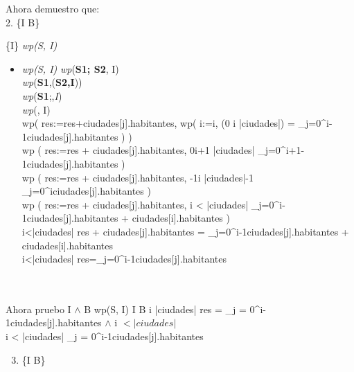 \documentclass[10pt,a4paper]{article}
\begin{document}
\vspace{0.3cm}

Ahora demuestro que:\\
\vspace{0.3cm}
2.  {\{I \land B\}}  {\{{I}\}  \implica \textit{wp(S, I)}
	
	\begin{itemize}
		\item 
		\textit{wp(S, I)}
		\equiv \textit{wp}(\textbf{S1; S2}, I)  \\
		\equiv \textit{wp}(\textbf{S1},(\textbf{S2,I}))  \\
		\equiv \textit{wp}(\textbf{S1};\;\;,\textit{I}) \\
		\equiv \textit{wp}(, I) \\
		\equiv wp\left( res:=res+ciudades[j].habitantes, wp\left( i:=i, (0 \leq i \leq |ciudades|) \land {} = \sum\limits_{j=0}^{i-1}ciudades[j].habitantes \right) \right) \\
		\equiv wp \left( res:=res + ciudades[j].habitantes, 0\leq i+1 \leq |ciudades| \wedge \sum\limits_{j=0}^{i+1-1}ciudades[j].habitantes \right) \\
		\equiv wp \left( res:=res + ciudades[j].habitantes, -1\leq i \leq |ciudades|-1 \wedge \sum\limits_{j=0}^{i}ciudades[j].habitantes \right)\\
		\equiv wp \left( res:=res + ciudades[j].habitantes, i < |ciudades| \wedge \sum\limits_{j=0}^{i-1}ciudades[j].habitantes + ciudades[i].habitantes \right)\\
		\equiv i<|ciudades| \wedge res + ciudades[j].habitantes = \sum\limits_{j=0}^{i-1}ciudades[j].habitantes + ciudades[i].habitantes \\
		\equiv i<|ciudades| \wedge res=\sum\limits_{j=0}^{i-1}ciudades[j].habitantes
	\end{itemize}
	 \\ \\Ahora pruebo {I $\wedge$ B} \implica wp(S, I)
	 I \wedge B  \leq i \leq |ciudades| \wedge res = \sum\limits_{j = 0}^{i-1}ciudades[j].habitantes
		 $\wedge$ i $< |ciudades|$ \\ \equiv i < |ciudades| \wedge \sum\limits_{j = 0}^{i-1}ciudades[j].habitantes
		
		
		\begin{enumerate}
	    \setcounter{enumi}{2}  %
		\item {\{I \land  \neg B\}} \implica{}
			

\end{enumerate}}
\end{document}
